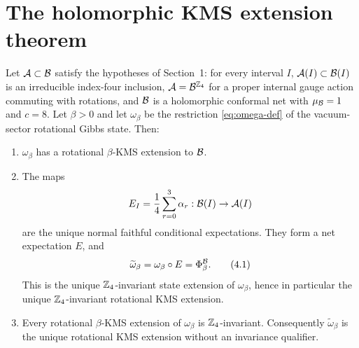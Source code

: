 \section{The holomorphic KMS extension theorem}

\begin{theorem}
\label{thm:main}
Let $\mathcal A\subset\mathcal B$ satisfy the hypotheses of Section~1: for every
interval $I$, $\mathcal A(I)\subset\mathcal B(I)$ is an irreducible index-four
inclusion, $\mathcal A=\mathcal B^{\mathbb Z_4}$ for a proper internal gauge action
commuting with rotations, and $\mathcal B$ is a holomorphic conformal net
with $\mu_{\mathcal B}=1$ and $c=8$.  Let $\beta>0$ and let
$\omega_\beta$ be the restriction \eqref{eq:omega-def} of the
vacuum-sector rotational Gibbs state.  Then:
\begin{enumerate}[label=\textup{(\alph*)}]
\item $\omega_\beta$ has a rotational $\beta$-KMS extension to
  $\mathcal B$.
\item The maps
  \[
    E_I=\frac14\sum_{r=0}^{3}\alpha_r:
    \mathcal B(I)\to\mathcal A(I)
  \]
  are the unique normal faithful conditional expectations.  They
  form a net expectation $E$, and
  \[
    \widetilde\omega_\beta
    =\omega_\beta\circ E
    =\Phi_\beta^{\mathcal B}.
  \tag{4.1}\label{eq:main-extension}
  \]
  This is the unique $\mathbb Z_4$-invariant state extension of
  $\omega_\beta$, hence in particular the unique
  $\mathbb Z_4$-invariant rotational KMS extension.
\item Every rotational $\beta$-KMS extension of $\omega_\beta$ is
  $\mathbb Z_4$-invariant.  Consequently
  $\widetilde\omega_\beta$ is the unique rotational KMS extension
  without an invariance qualifier.
\end{enumerate}
\end{theorem}


